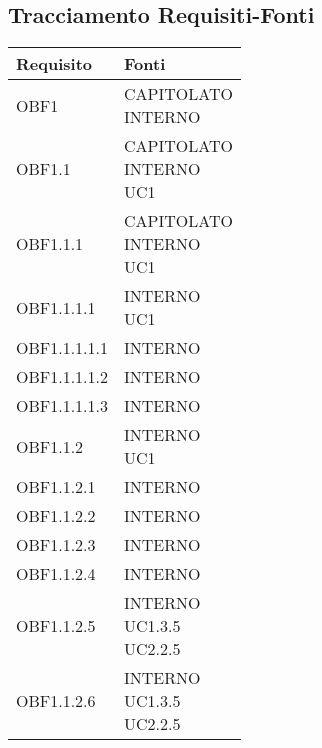 \documentclass{scalatekids-article}
\begin{document}
\subsection{Tracciamento Requisiti-Fonti}
\begin{longtable}[H]{|p{5.5cm}|p{5.5cm}|}
\hline
\textbf{Requisito} & \textbf{Fonti}\\
\hline
OBF1 & \multiLineCell[t]{CAPITOLATO\\INTERNO\\}\\
\hline
OBF1.1 & \multiLineCell[t]{CAPITOLATO\\INTERNO\\UC1\\}\\
\hline
OBF1.1.1 & \multiLineCell[t]{CAPITOLATO\\INTERNO\\UC1\\}\\
\hline
OBF1.1.1.1 & \multiLineCell[t]{INTERNO\\UC1\\}\\
\hline
OBF1.1.1.1.1 & \multiLineCell[t]{INTERNO\\}\\
\hline
OBF1.1.1.1.2 & \multiLineCell[t]{INTERNO\\}\\
\hline
OBF1.1.1.1.3 & \multiLineCell[t]{INTERNO\\}\\
\hline
OBF1.1.2 & \multiLineCell[t]{INTERNO\\UC1\\}\\
\hline
OBF1.1.2.1 & \multiLineCell[t]{INTERNO\\}\\
\hline
OBF1.1.2.2 & \multiLineCell[t]{INTERNO\\}\\
\hline
OBF1.1.2.3 & \multiLineCell[t]{INTERNO\\}\\
\hline
OBF1.1.2.4 & \multiLineCell[t]{INTERNO\\}\\
\hline
OBF1.1.2.5 & \multiLineCell[t]{INTERNO\\UC1.3.5\\UC2.2.5\\}\\
\hline
OBF1.1.2.6 & \multiLineCell[t]{INTERNO\\UC1.3.5\\UC2.2.5\\}\\

\end{longtable}
\end{document}
